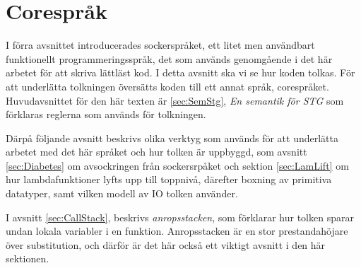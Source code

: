 \documentclass[Rapport]{subfiles}
\begin{document}
\section{Corespråk}
\label{sec:Core}


\overviewCore


I förra avsnittet introducerades sockerspråket, ett litet men användbart
funktionellt programmeringsspråk, det som används genomgående i det här
arbetet för att skriva lättläst kod.
    I detta avsnitt ska vi se hur koden tolkas. För att underlätta
tolkningen översätts koden till ett annat språk, corespråket. 
Huvudavsnittet för den här texten är \ref{sec:SemStg}, \emph{En semantik för STG}
som förklaras reglerna som används för
tolkningen. 

Därpå följande avsnitt beskrivs olika verktyg som används för att
underlätta arbetet med det här språket och hur tolken är uppbyggd,
som avsnitt \ref{sec:Diabetes} om avsockringen från sockersrpåket och 
sektion \ref{sec:LamLift} 
om hur lambdafunktioner lyfts upp till toppnivå, därefter
boxning av primitiva datatyper, samt vilken modell av IO tolken använder.

I avsnitt \ref{sec:CallStack}, beskrivs \emph{anropsstacken}, som förklarar hur tolken
sparar undan lokala variabler i en funktion. Anropsstacken är en 
stor prestandahöjare över substitution, och därför är det här också ett
viktigt avsnitt i den här sektionen.










\end{document}
